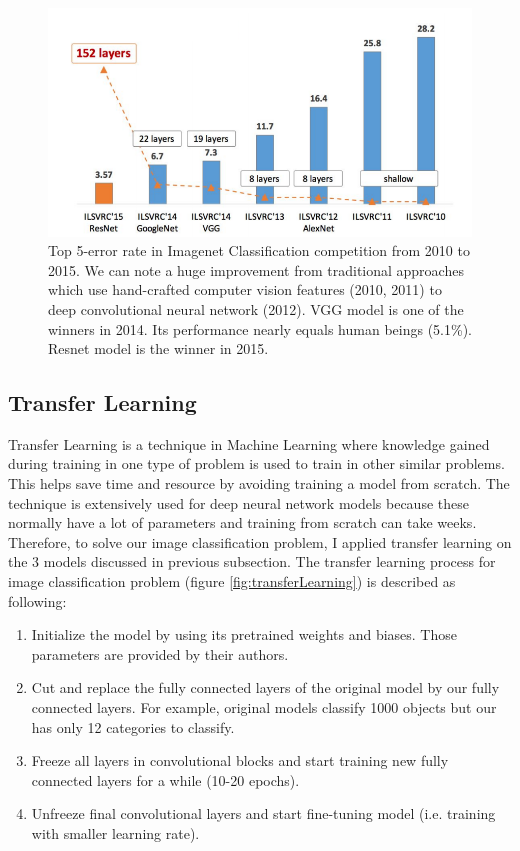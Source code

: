 \begin{figure}[tb]
\centering
\includegraphics[width=0.8\hsize]{./figures/imagenetTop5}
\caption{Top 5-error rate in Imagenet Classification competition from 2010 to 2015. We can note a huge improvement from traditional approaches which use hand-crafted computer vision features (2010, 2011) to deep convolutional neural network (2012). VGG model \cite{DBLP:journals/corr/SimonyanZ14a} is one of the winners in 2014. Its performance nearly equals human beings (5.1\%). Resnet model \cite{DBLP:journals/corr/HeZRS15} is the winner in 2015. }
\label{fig:imagenetTop5Err}
\end{figure}

\subsection{Transfer Learning}
\label{sec:transferLearning}
Transfer Learning is a technique in Machine Learning where knowledge gained during training in one type of problem is used to train in other similar problems. This helps save time and resource by avoiding training a model from scratch. The technique is extensively used for deep neural network models because these normally have a lot of parameters and training from scratch can take weeks. Therefore, to solve our image classification problem, I applied transfer learning on the 3 models discussed in previous subsection. The transfer learning process for image classification problem (figure \ref{fig:transferLearning}) is described as following:
\begin{enumerate}
	\item Initialize the model by using its pretrained weights and biases. Those parameters are provided by their authors.
	\item Cut and replace the fully connected layers of the original model by our  fully connected layers. For example, original models classify 1000 objects but our has only 12 categories to classify.
	\item Freeze all layers in convolutional blocks and start training new fully connected layers for a while (10-20 epochs).
	\item Unfreeze final convolutional layers and start fine-tuning model (i.e. training with smaller learning rate).
\end{enumerate}

